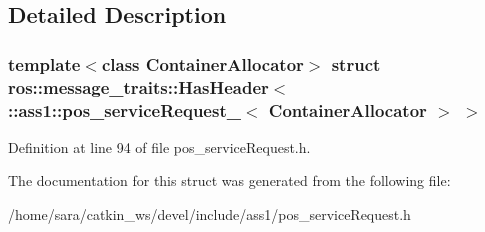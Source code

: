 \subsection{Detailed Description}
\subsubsection*{template$<$class Container\+Allocator$>$\newline
struct ros\+::message\+\_\+traits\+::\+Has\+Header$<$ \+::ass1\+::pos\+\_\+service\+Request\+\_\+$<$ Container\+Allocator $>$ $>$}



Definition at line 94 of file pos\+\_\+service\+Request.\+h.



The documentation for this struct was generated from the following file\+:\begin{DoxyCompactItemize}
\item 
/home/sara/catkin\+\_\+ws/devel/include/ass1/pos\+\_\+service\+Request.\+h\end{DoxyCompactItemize}
